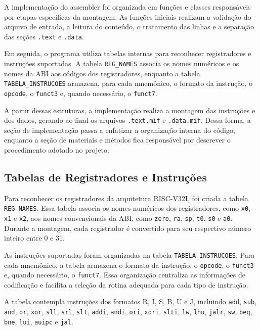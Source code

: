 \documentclass[conference]{IEEEtran}
\begin{document}
A implementação do assembler foi organizada em funções e classes responsáveis por etapas específicas da montagem. As funções iniciais realizam a validação do arquivo de entrada, a leitura do conteúdo, o tratamento das linhas e a separação das seções \texttt{.text} e \texttt{.data}.

Em seguida, o programa utiliza tabelas internas para reconhecer registradores e instruções suportadas. A tabela \texttt{REG\_NAMES} associa os nomes numéricos e os nomes da ABI aos códigos dos registradores, enquanto a tabela \texttt{TABELA\_INSTRUCOES} armazena, para cada mnemônico, o formato da instrução, o \texttt{opcode}, o \texttt{funct3} e, quando necessário, o \texttt{funct7}.

A partir dessas estruturas, a implementação realiza a montagem das instruções e dos dados, gerando ao final os arquivos \texttt{.text.mif} e \texttt{.data.mif}. Dessa forma, a seção de implementação passa a enfatizar a organização interna do código, enquanto a seção de materiais e métodos fica responsável por descrever o procedimento adotado no projeto.

\subsection{Tabelas de Registradores e Instruções}

Para reconhecer os registradores da arquitetura RISC-V32I, foi criada a tabela \texttt{REG\_NAMES}. Essa tabela associa os nomes numéricos dos registradores, como \texttt{x0}, \texttt{x1} e \texttt{x2}, aos nomes convencionais da ABI, como \texttt{zero}, \texttt{ra}, \texttt{sp}, \texttt{t0}, \texttt{s0} e \texttt{a0}. Durante a montagem, cada registrador é convertido para seu respectivo número inteiro entre 0 e 31.

As instruções suportadas foram organizadas na tabela \texttt{TABELA\_INSTRUCOES}. Para cada mnemônico, a tabela armazena o formato da instrução, o \texttt{opcode}, o \texttt{funct3} e, quando necessário, o \texttt{funct7}. Essa organização centraliza as informações de codificação e facilita a seleção da rotina adequada para cada tipo de instrução.

A tabela contempla instruções dos formatos R, I, S, B, U e J, incluindo \texttt{add}, \texttt{sub}, \texttt{and}, \texttt{or}, \texttt{xor}, \texttt{sll}, \texttt{srl}, \texttt{slt}, \texttt{addi}, \texttt{andi}, \texttt{ori}, \texttt{xori}, \texttt{slti}, \texttt{lw}, \texttt{lhu}, \texttt{jalr}, \texttt{sw}, \texttt{beq}, \texttt{bne}, \texttt{lui}, \texttt{auipc} e \texttt{jal}.
\end{document}
